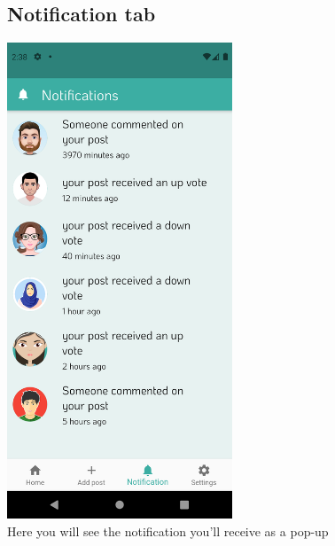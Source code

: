 \documentclass[12pt]{article}
\begin{document}
\begin{figure}[h!]
\vspace{-2cm}
  \subsection*{Notification tab}
\centerline{\includegraphics[width=0.6\textwidth]{./Screenshots/16.PNG}}
  \caption{Here you will see the notification you'll receive as a pop-up}
  \end{figure}
  
\end{document}
